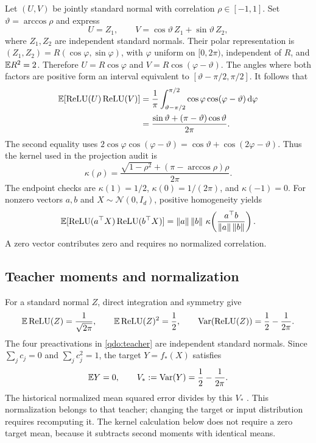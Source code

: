 Let $(U,V)$ be jointly standard normal with correlation $\rho\in[-1,1]$.
Set $\vartheta=\arccos\rho$ and express
\begin{equation}
 U=Z_1,\qquad V=\cos\vartheta\,Z_1+\sin\vartheta\,Z_2,
 \label{qdo:normalpair}
\end{equation}
where $Z_1,Z_2$ are independent standard normals. Their polar representation is
$(Z_1,Z_2)=R(\cos\varphi,\sin\varphi)$, with $\varphi$ uniform on
$[0,2\pi)$, independent of $R$, and $\mathbb E R^2=2$. Therefore
$U=R\cos\varphi$ and $V=R\cos(\varphi-\vartheta)$.
The angles where both factors are positive form an interval equivalent to
$[\vartheta-\pi/2,\pi/2]$. It follows that
\begin{align}
 \mathbb E[\operatorname{ReLU}(U)\operatorname{ReLU}(V)]
 &=\frac{1}{\pi}\int_{\vartheta-\pi/2}^{\pi/2}
       \cos\varphi\cos(\varphi-\vartheta)\,\mathrm d\varphi\\
 &=\frac{\sin\vartheta+(\pi-\vartheta)\cos\vartheta}{2\pi}.
 \label{qdo:polarint}
\end{align}
The second equality uses
$2\cos\varphi\cos(\varphi-\vartheta)=
\cos\vartheta+\cos(2\varphi-\vartheta)$.
Thus the kernel used in the projection audit is
\begin{equation}
 \boxed{\displaystyle
 \kappa(\rho)=
 \frac{\sqrt{1-\rho^2}+(\pi-\arccos\rho)\rho}{2\pi}.}
 \label{qdo:kappa}
\end{equation}
The endpoint checks are $\kappa(1)=1/2$, $\kappa(0)=1/(2\pi)$,
and $\kappa(-1)=0$. For nonzero vectors $a,b$ and $X\sim\mathcal N(0,I_d)$,
positive homogeneity yields
\begin{equation}
 \mathbb E[\operatorname{ReLU}(a^\top X)\operatorname{ReLU}(b^\top X)]
 =\left\lVert a\right\rVert\left\lVert b\right\rVert\,
 \kappa\!\left(\frac{a^\top b}{\left\lVert a\right\rVert\left\lVert b\right\rVert}\right).
 \label{qdo:nonunitkernel}
\end{equation}
A zero vector contributes zero and requires no normalized correlation.

\subsection{Teacher moments and normalization}
\label{qdo:moments}

For a standard normal $Z$, direct integration and symmetry give
\begin{equation}
 \mathbb E\operatorname{ReLU}(Z)=\frac{1}{\sqrt{2\pi}},\qquad
 \mathbb E\operatorname{ReLU}(Z)^2=\frac12,\qquad
 \operatorname{Var}(\operatorname{ReLU}(Z))=\frac12-\frac{1}{2\pi}.
 \label{qdo:normalmoments}
\end{equation}
The four preactivations in \eqref{qdo:teacher} are independent standard
normals. Since $\sum_jc_j=0$ and $\sum_jc_j^2=1$, the target $Y=f_*(X)$
satisfies
\begin{equation}
 \mathbb E Y=0,\qquad V_*:=\operatorname{Var}(Y)=\frac12-\frac{1}{2\pi}.
 \label{qdo:teachermoments}
\end{equation}
The historical normalized mean squared error divides by this $V_*$
\cite{qdo,projection}. This normalization belongs to that teacher; changing
the target or input distribution requires recomputing it. The kernel
calculation below does not require a zero target mean, because it subtracts
second moments with identical means.

